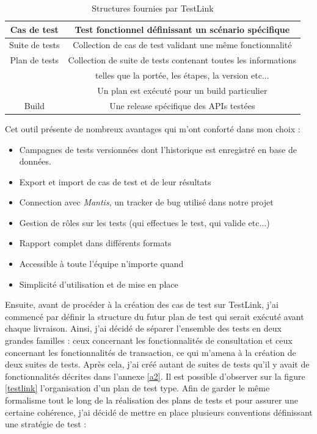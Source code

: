 \begin{table}[h!]
	\center
	\begin{tabular}{| c | c |}
     \hline
     Cas de test & Test fonctionnel définissant un scénario spécifique \\ \hline
     Suite de tests & Collection de cas de test validant une même fonctionnalité \\ \hline
     Plan de tests & Collection de suite de tests contenant toutes les informations \\  & telles que la portée, les étapes, la version etc...\\ & Un plan est exécuté pour un build particulier \\ \hline
     Build & Une release spécifique des APIs testées \\
     \hline
	\end{tabular}
	\caption{Structures fournies par TestLink}
	\label{structuresTestlink}
\end{table}

Cet outil présente de nombreux avantages qui m'ont conforté dans mon choix :
\begin{itemize}
	\item Campagnes de tests versionnées dont l'historique est enregistré en base de données.
	\item Export et import de cas de test et de leur résultats
	\item Connection avec \textit{Mantis}, un tracker de bug utilisé dans notre projet
	\item Gestion de rôles sur les tests (qui effectues le test, qui valide etc...)
	\item Rapport complet dans différents formats
	\item Accessible à toute l'équipe n'importe quand 
	\item Simplicité d'utilisation et de mise en place \\
\end{itemize}

	Ensuite, avant de procéder à la création des cas de test sur TestLink, j'ai commencé par définir la structure du futur plan de test qui serait exécuté avant chaque livraison. Ainsi, j'ai décidé de séparer l'ensemble des tests en deux grandes familles : ceux concernant les fonctionnalités de consultation et ceux concernant les fonctionnalités de transaction, ce qui m'amena à la création de deux suites de tests. Après cela, j'ai créé autant de suites de tests qu'il y avait de fonctionnalités décrites dans l'annexe \ref{a2}. Il est possible d'observer sur la figure \ref{testlink} l'organisation d'un plan de test type. Afin de garder le même formalisme tout le long de la réalisation des plans de tests et pour assurer une certaine cohérence, j'ai décidé de mettre en place plusieurs conventions définissant une stratégie de test :
	
